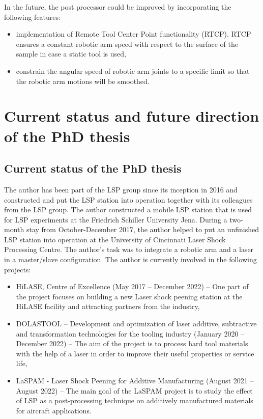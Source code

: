 In the future, the post processor could be improved by incorporating the following features:

\begin{itemize}

    \item implementation of Remote Tool Center Point functionality (RTCP). RTCP ensures a constant robotic arm speed with respect to the surface of the sample in case a static tool is used,

    \item constrain the angular speed of robotic arm joints to a specific limit so that the robotic arm motions will be smoothed.

\end{itemize}
\section{Current status and future direction of the PhD thesis}

\subsection{Current status of the PhD thesis}

The author has been part of the LSP group since its inception in 2016 and constructed and put the LSP station into operation together with its colleagues from the LSP group. The author constructed a mobile LSP station that is used for LSP experiments at the Friedrich Schiller University Jena. During a two-month stay from October-December 2017, the author helped to put an unfinished LSP station into operation at the University of Cincinnati Laser Shock Processing Centre. The author's task was to integrate a robotic arm and a laser in a master/slave configuration. The author is currently involved in the following projects:

\begin{itemize}

    \item HiLASE, Centre of Excellence (May 2017 -- December 2022) -- One part of the project focuses on building a new Laser shock peening station at the HiLASE facility and attracting partners from the industry,

    \item DOLASTOOL -- Development and optimization of laser additive, subtractive and transformation technologies for the tooling industry (January 2020 -- December 2022) -- The aim of the project is to process hard tool materials with the help of a laser in order to improve their useful properties or service life, 

    \item LaSPAM - Laser Shock Peening for Additive Manufacturing (August 2021 -- August 2022) -- The main goal of the LaSPAM project is to study the effect of LSP as a post-processing technique on additively manufactured materials for aircraft applications.
    
\end{itemize}
    
